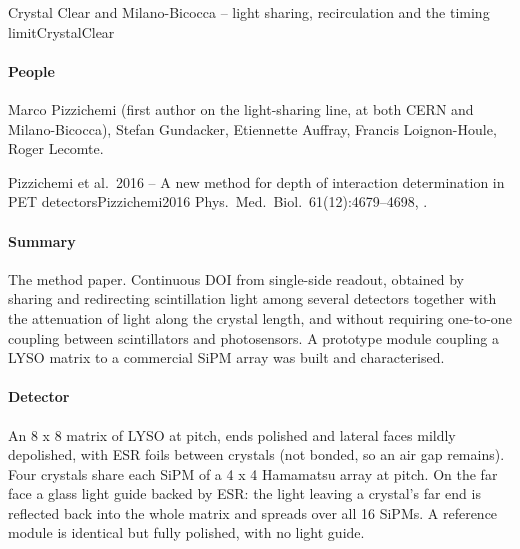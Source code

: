 \begin{programnote}{Crystal Clear and Milano-Bicocca -- light sharing, recirculation and the timing limit}{CrystalClear}
\paragraph{People}
Marco Pizzichemi (first author on the light-sharing line, at both CERN and
Milano-Bicocca), Stefan Gundacker, Etiennette Auffray, Francis Loignon-Houle,
Roger Lecomte.

\begin{papernote}{Pizzichemi et al.\ 2016 -- A new method for depth of interaction determination in PET detectors}{Pizzichemi2016}
Phys.\ Med.\ Biol.\ 61(12):4679--4698, .

\paragraph{Summary}
The method paper. Continuous DOI from single-side readout, obtained by sharing
and redirecting scintillation light among several detectors together with the
attenuation of light along the crystal length, and without requiring
one-to-one coupling between scintillators and photosensors. A prototype module
coupling a LYSO matrix to a commercial SiPM array was built and characterised.

\paragraph{Detector}
An 8 x 8 matrix of  LYSO at  pitch,
ends polished and lateral faces mildly depolished, with  ESR foils
between crystals (not bonded, so an air gap remains). Four crystals share each
 SiPM of a 4 x 4 Hamamatsu array at  pitch.
On the far face a  glass light guide backed by ESR: the light leaving a
crystal's far end is reflected back into the whole matrix and spreads over all
16 SiPMs. A reference module is identical but fully polished, with no light
guide.


\end{papernote}
\end{programnote}
